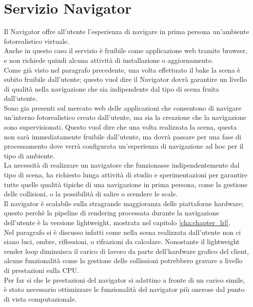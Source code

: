 \section{Servizio Navigator}
\label{sec:chapter_architettura_sistema_il_servizio_navigator}

Il Navigator offre all’utente l’esperienza di navigare in prima persona un’ambiente fotorealistico virtuale.
\\
Anche in questo caso il servizio è fruibile come applicazione web tramite browser, e non richiede quindi alcuna attività di installazione o aggiornamento.
\\
Come già visto nel paragrafo precedente, una volta effettuato il bake la scena è subito fruibile dall’utente; questo vuol dire il Navigator dovrà garantire un livello di qualità nella navigazione che sia indipendente dal tipo di scena fruita dall’utente.
\\
Sono gia presenti sul mercato web delle applicazioni che consentono di navigare un’interno fotorealistico creato dall’utente, ma sia la creazione che la navigazione sono supervisionati. Questo vuol dire che una volta realizzata la scena, questa non sarà immediatamente fruibile dall’utente, ma dovrà passare per una fase di processamento dove verrà configurata un’esperienza di navigazione ad hoc per il tipo di ambiente.
\\
La necessità di realizzare un navigatore che funzionasse indipendentemente dal tipo di scena, ha richiesto lunga attività di studio e sperimentazioni per garantire tutte quelle qualità tipiche di una navigazione in prima persona, come la gestione delle collisioni, o la possibilità di salire o scendere le scale. 
\\
Il navigator è scalabile sulla stragrande maggioranza delle piattaforne hardware; questo perchè la pipeline di rendering processata durante la navigazione dell’utente è la versione lightweight, mostrata nel capitolo \ref{cha:chapter_lrl}. 
\\
Nel paragrafo si è discusso infatti come nella scena realizzata dall’utente non ci siano luci, ombre, riflessioni, o rifrazioni da calcolare. Nonostante il lightweight render loop diminuisca il carico di lavoro da parte dell’hardware grafico del client, alcune funzionalità come la gestione delle collissioni potrebbero gravare a livello di prestazioni sulla CPU. 
\\
Per far si che le prestazioni del navigator si adattino a fronte di un carico simile, è stato necessario ottimizzare le funzionalità del navigator più onerose dal punto di vista computazionale.
